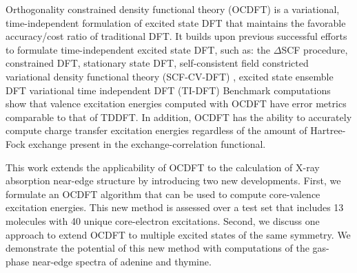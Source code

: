 \documentclass[11.5pt]{article}
\begin{document}
Orthogonality constrained density functional theory (OCDFT)\cite{evangelista_orthogonality_2013}  is a variational, time-independent formulation of excited state DFT that maintains the favorable accuracy/cost ratio of traditional DFT. It builds upon previous successful efforts to formulate time-independent excited state DFT, such as: the $\Delta$SCF procedure, \cite{kowalczyk_assessment_2011,ziegler_calculation_1977} constrained DFT,\cite{wu_constrained_2006} stationary state DFT, \cite{gorling_density-functional_1999} self-consistent field constricted variational density functional theory (SCF-CV-DFT) , \cite{ziegler_relation_2009,ziegler_application_2011,krykunov_self-consistent_2013,ziegler_implementation_2012} excited state ensemble DFT \cite{theophilou_energy_1979,fritsche_generalized_1986,gross_rayleigh-ritz_1988,gross_density-functional_1988} variational time independent DFT (TI-DFT) \cite{levy_variational_1999,nagy_variational_2001} Benchmark computations show that valence excitation energies computed with OCDFT have error metrics comparable to that of TDDFT.  In addition, OCDFT has the ability to accurately compute charge transfer excitation energies regardless of the amount of Hartree-Fock exchange present in the exchange-correlation functional.

This work extends the applicability of OCDFT to the calculation of X-ray  absorption near-edge structure by introducing two new developments.
First, we formulate an OCDFT algorithm that can be used to compute core-valence excitation energies.  This new method is assessed over a test set that includes 13 molecules with 40 unique core-electron excitations.
Second, we discuss one approach to extend OCDFT to multiple excited states of the same symmetry.
We demonstrate the potential of this new method with computations of the gas-phase near-edge spectra of adenine and thymine.
\end{document}
